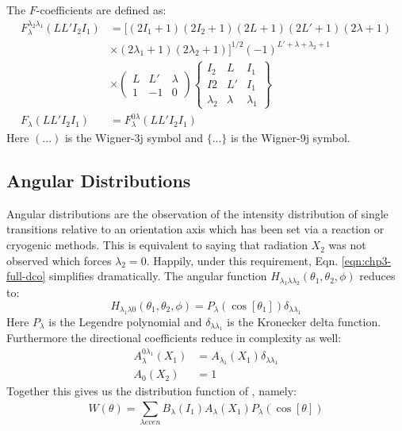 The $F$-coefficients are defined as:
\begin{align}
F_{\lambda{}}^{\lambda{}_2\lambda{}_1}(L L' I_2 I_1) &=[(2I_1+1)(2I_2+1)(2L+1)(2L'+1)(2\lambda{}+1)\nonumber \\ & \times{} (2\lambda{}_1+1)(2\lambda{}_2+1)]^{1/2} (-1)^{L'+\lambda{}+\lambda{}_2+1}\nonumber \\
& \times{} \left(\begin{array}{clcr}L & L' & \lambda{}\\ 1 & -1 & 0  \end{array}\right) \left\{\begin{array}{clcr}I_2 & L & I_1\\ I2 & L' & I_1\\ \lambda{}_2 & \lambda{} & \lambda{}_1 \end{array}\right\} \label{eqn:chp3-gen-fcoef}\\
F_{\lambda{}}(L L' I_2 I_1) &= F_{\lambda{}}^{0\lambda{}}(L L' I_2 I_1)\label{eqn:chp3-fcoef}
\end{align}
Here $(...)$ is the Wigner-3j symbol and $\{ ... \}$ is the Wigner-9j symbol.

\subsection{Angular Distributions}
\label{ssec:exp-pr-data-ang-dist}
Angular distributions are the observation of the intensity distribution of single transitions relative to an orientation axis which has been set via a reaction or cryogenic methods. This is equivalent to saying that radiation $X_2$ was not observed which forces $\lambda{}_2=0$. Happily, under this requirement, Eqn. \ref{eqn:chp3-full-dco} simplifies dramatically. The angular function $H_{\lambda{}_1\lambda{}\lambda{}_2}\left(\theta{}_1,\theta{}_2,\phi{}\right)$ reduces to:
\begin{equation}
\label{eqn:chp3-simple-ang-func}
H_{\lambda{}_1\lambda{}0}\left(\theta{}_1,\theta{}_2,\phi{}\right) = P_{\lambda{}}(\cos[\theta{}_1])\delta_{\lambda{}\lambda{}_1}
\end{equation}
Here $P_{\lambda{}}$ is the Legendre polynomial and $\delta_{\lambda{}\lambda{}_1}$ is the Kronecker delta function. Furthermore the directional coefficients reduce in complexity as well:
\begin{align}
A_{\lambda{}}^{0\lambda{}_1}\left(X_1\right) &= A_{\lambda{}_1}\left(X_1\right)\delta_{\lambda{}\lambda{}_1} \label{eqn:chp3-gen-ddc-red}\\
A_{0}\left(X_2\right) &= 1 \label{eqn:chp3-ddc-red}
\end{align}
Together this gives us the distribution function of \cite{angDist}, namely:
\begin{equation}
\label{eqn:chp3-ang-dist}
W(\theta{}) = \sum\limits_{\lambda even}^{} B_{\lambda{}}\left(I_1\right) A_{\lambda{}}\left(X_1\right) P_{\lambda{}}(\cos[\theta{}])
\end{equation}

